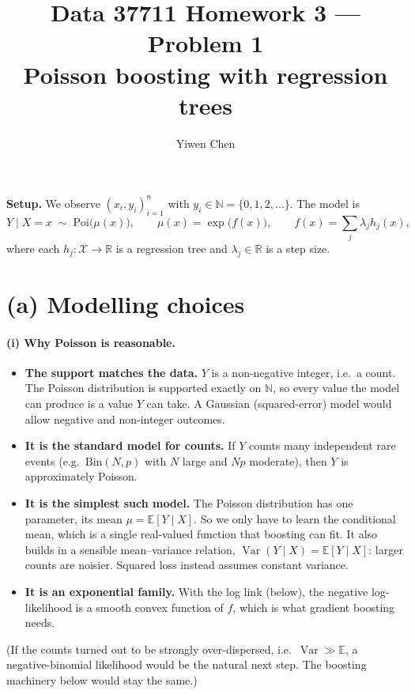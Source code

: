 \documentclass[11pt]{article}
\title{Data 37711 Homework 3 --- Problem 1\\
\large Poisson boosting with regression trees}
\author{Yiwen Chen}
\date{}
\newcommand{\E}{\mathbb{E}}
\newcommand{\R}{\mathbb{R}}
\newcommand{\N}{\mathbb{N}}
\begin{document}
\maketitle

\noindent\textbf{Setup.} We observe $(x_i,y_i)_{i=1}^n$ with $y_i\in\N=\{0,1,2,\dots\}$. The model is
\[
Y\mid X=x\;\sim\;\mathrm{Poi}\bigl(\mu(x)\bigr),\qquad \mu(x)=\exp\bigl(f(x)\bigr),\qquad
f(x)=\sum_{j}\lambda_j h_j(x),
\]
where each $h_j:\mathcal X\to\R$ is a regression tree and $\lambda_j\in\R$ is a step size.

\section*{(a) Modelling choices}

\paragraph{(i) Why Poisson is reasonable.}
\begin{itemize}
\item \textbf{The support matches the data.} $Y$ is a non-negative integer, i.e.\ a count. The
Poisson distribution is supported exactly on $\N$, so every value the model can produce is a value
$Y$ can take. A Gaussian (squared-error) model would allow negative and non-integer outcomes.
\item \textbf{It is the standard model for counts.} If $Y$ counts many independent rare events
(e.g.\ $\mathrm{Bin}(N,p)$ with $N$ large and $Np$ moderate), then $Y$ is approximately Poisson.
\item \textbf{It is the simplest such model.} The Poisson distribution has one parameter, its mean
$\mu=\E[Y\mid X]$. So we only have to learn the conditional mean, which is a single real-valued
function that boosting can fit. It also builds in a sensible mean--variance relation,
$\operatorname{Var}(Y\mid X)=\E[Y\mid X]$: larger counts are noisier. Squared loss instead assumes
constant variance.
\item \textbf{It is an exponential family.} With the log link (below), the negative log-likelihood
is a smooth convex function of $f$, which is what gradient boosting needs.
\end{itemize}
(If the counts turned out to be strongly over-dispersed, i.e.\ $\operatorname{Var}\gg\E$, a
negative-binomial likelihood would be the natural next step. The boosting machinery below would stay
the same.)
\end{document}

